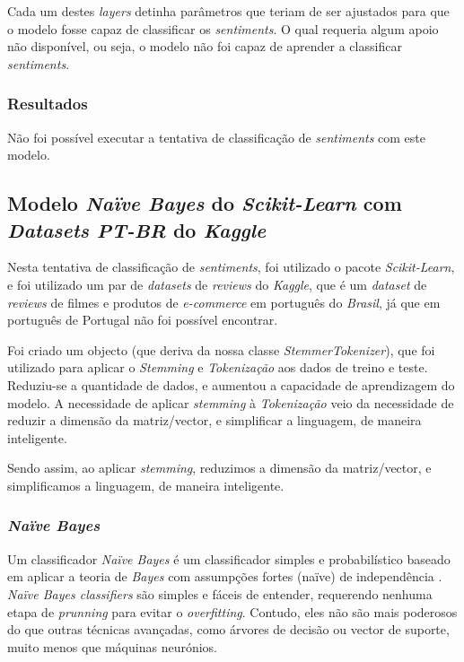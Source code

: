 Cada um destes \textit{layers} detinha parâmetros que teriam de ser ajustados para que o modelo fosse capaz de classificar os \textit{sentiments}. O qual requeria algum apoio não disponível, ou seja, o modelo não foi capaz de aprender a classificar \textit{sentiments}.

\subsubsection{Resultados}

Não foi possível executar a tentativa de classificação de \textit{sentiments} com este modelo.

\subsection{Modelo \textit{Naïve Bayes} do \textit{Scikit-Learn} com \textit{Datasets PT-BR} do \textit{Kaggle}}

Nesta tentativa de classificação de \textit{sentiments}, foi utilizado o pacote \textit{Scikit-Learn}, e foi utilizado um par de \textit{datasets} de \textit{reviews} do \textit{Kaggle}, que é um \textit{dataset} de \textit{reviews} de filmes e produtos de \textit{e-commerce} em português do \textit{Brasil}, já que em português de Portugal não foi possível encontrar.

Foi criado um objecto (que deriva da nossa classe \textit{StemmerTokenizer}), que foi utilizado para aplicar o \textit{Stemming} e \textit{Tokenização} aos dados de treino e teste. Reduziu-se a quantidade de dados, e aumentou a capacidade de aprendizagem do modelo. A necessidade de aplicar \textit{stemming} à \textit{Tokenização} veio da necessidade de reduzir a dimensão da matriz/vector, e simplificar a linguagem, de maneira inteligente.

Sendo assim, ao aplicar \textit{stemming}, reduzimos a dimensão da matriz/vector, e simplificamos a linguagem, de maneira inteligente.

\subsubsection{\textit{Naïve Bayes}}

Um classificador \textit{Naïve Bayes} é um classificador simples e probabilístico baseado em aplicar a teoria de \textit{Bayes} com assumpções fortes ({naïve}) de independência \cite{mbn1}. \textit{Naïve Bayes classifiers} são simples e fáceis de entender, requerendo nenhuma etapa de \textit{prunning} para evitar o \textit{overfitting}. Contudo, eles não são mais poderosos do que outras técnicas avançadas, como árvores de decisão ou vector de suporte, muito menos que máquinas neurónios.

